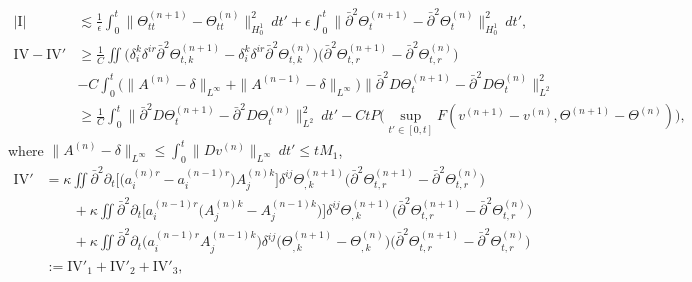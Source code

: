 \documentclass[12pt,a4paper]{amsart}
\numberwithin{equation}{section}
\theoremstyle{plain}
\theoremstyle{definition}
\newcommand{\bpartial}{\bar{\partial}}
\begin{document}
\begin{align*}
|\mathrm{I}| &\lesssim  \frac{1}{\epsilon}\int_{0}^{t}  \|\Theta^{(n+1)}_{tt}-\Theta^{(n)}_{tt}\|_{H_0^1}^2 \ dt'
+  \epsilon \int_{0}^{t}  \|\bpartial^2 \Theta^{(n+1)}_t-\bpartial^2\Theta^{(n)}_t\|_{H_0^1} ^2\ dt',\\
\mathrm{IV}-\mathrm{IV}'&\geq \frac{1}{C}\iint \Big(\delta_i^k \delta^{ir} \bpartial^2 \Theta^{(n+1)}_{t,k}-\delta_i^k \delta^{ir} \bpartial^2 \Theta^{(n)}_{t,k}\Big)\Big( \bpartial^2\Theta^{(n+1)}_{t,r}-\bpartial^2\Theta^{(n)}_{t,r}\Big)\\
            &-C \int_{0}^{t} \Big( \|A^{(n)}-\delta\|_{L^{\infty}}+\|A^{(n-1)}-\delta\|_{L^{\infty}}\Big) \|\bpartial^2 D\Theta^{(n+1)}_{t}-\bpartial^2 D\Theta^{(n)}_{t}\|_{L^2}^2\\
&\geq \frac{1}{C} \int_{0}^{t} \|\bpartial^2 D\Theta^{(n+1)}_{t}-\bpartial^2 D\Theta^{(n)}_{t}\|_{L^2}^2 \ dt'-CtP\Big(\sup\limits_{t'\in[0,t]}F(v^{(n+1)}-v^{(n)},\Theta^{(n+1)}-\Theta^{(n)})\Big),
\end{align*}
where $\|A^{(n)}-\delta\|_{L^{\infty}}\leq \int_{0}^{t} \|Dv^{(n)}\|_{L^{\infty}}\ dt' \leq tM_1$, 
\begin{align*}
\mathrm{IV}'&=\kappa \iint \bpartial^2 \partial_t \Big[\Big( a^{(n)r}_i-a^{(n-1)r}_i \Big) A^{(n)k}_j\Big] \delta^{ij} \Theta_{,k}^{(n+1)}\Big( \bpartial^2 \Theta_{t,r}^{(n+1)}-\bpartial^2 \Theta_{t,r}^{(n)}\Big)\\
 &\qquad+\kappa \iint \bpartial^2 \partial_t \Big[a^{(n-1)r}_i\Big( A^{(n)k}_j-A^{(n-1)k}_j \Big) \Big] \delta^{ij} \Theta_{,k}^{(n+1)}\Big( \bpartial^2 \Theta_{t,r}^{(n+1)}-\bpartial^2 \Theta_{t,r}^{(n)}\Big)\\
  &\qquad+\kappa \iint \bpartial^2 \partial_t \Big(a^{(n-1)r}_iA^{(n-1)k}_j  \Big) \delta^{ij} \Big(\Theta_{,k}^{(n+1)}-\Theta_{,k}^{(n)}\Big)\Big( \bpartial^2 \Theta_{t,r}^{(n+1)}-\bpartial^2 \Theta_{t,r}^{(n)}\Big)\\
  &:=\mathrm{IV}'_1+\mathrm{IV}'_2+\mathrm{IV}'_3,
\end{align*}
\end{document}
